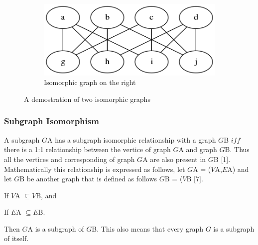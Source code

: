 \begin{figure}[H]
\begin{subfigure}[b]{0.4\textwidth}
    \includegraphics[width=\textwidth]{isomorphismright}
    \caption{Isomorphic graph on the right}
    \label{fig:isomorphism}
  \end{subfigure}
  \caption{A demostration of two isomorphic graphs}
\end{figure}

\subsubsection{Subgraph Isomorphism}
A subgraph $G${\tiny A}  has a subgraph isomorphic relationship with a graph $G${\tiny B} $iff$ there is a 1:1 relationship between the vertice of graph 
$G${\tiny A} and graph $G${\tiny B}. Thus all the vertices and corresponding of graph $G${\tiny A} are also present in $G${\tiny B} [1]. Mathematically this
relationship is expressed as follows, let $G${\tiny A} = ($V${\tiny A},$E${\tiny A}) and let $G${\tiny B} be another graph that is defined as 
follows $G${\tiny B} = ($V${\tiny B} [7].

\begin{myEnumerate}
  \item If $V${\tiny A} $ \subseteq V${\tiny B}, and
  \item If $E${\tiny A} $ \subseteq E${\tiny B}.
\end{myEnumerate}
Then $G${\tiny A} is a subgraph of $G${\tiny B}. This also means that every graph $G$ is a subgraph of itself.
\newpage